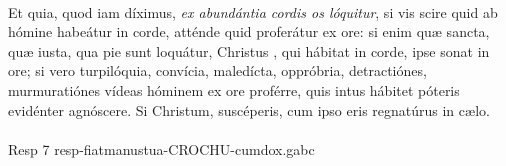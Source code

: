 \documentclass[options]{article}
\begin{document}
	\\
	Et quia, quod iam díximus, \emph{ex abundántia cordis os lóquitur}, si vis scire quid ab hómine habeátur in corde, atténde quid proferátur ex ore: si enim quæ sancta, quæ iusta, qua pie sunt loquátur, Christus , qui hábitat in corde, ipse sonat in ore; si vero turpilóquia, convícia, maledícta, oppróbria, detractiónes, murmuratiónes vídeas hóminem ex ore proférre, quis intus hábitet póteris evidénter agnóscere. Si Christum, suscéperis, cum ipso eris regnatúrus in cælo.\\
	\\
	Resp 7 resp-fiatmanustua-CROCHU-cumdox.gabc
\end{document}
